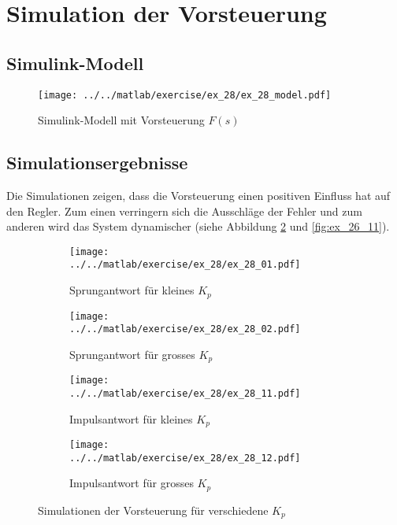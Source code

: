 \section{Simulation der Vorsteuerung}

\subsection{Simulink-Modell}
\begin{figure}[h!]
	\centering
	\texttt{[image: ../../matlab/exercise/ex\_28/ex\_28\_model.pdf]}
	\caption{Simulink-Modell mit Vorsteuerung $F(s)$}
\end{figure}

\subsection{Simulationsergebnisse}
Die Simulationen zeigen, dass die Vorsteuerung einen positiven Einfluss hat
auf den Regler. Zum einen verringern sich die Ausschläge der Fehler und zum
anderen wird das System dynamischer (siehe Abbildung \ref{fig:ex_28_11} und
\ref{fig:ex_26_11}).
\begin{figure}[h!]
	\centering
	\begin{subfigure}{0.45\textwidth}
		\texttt{[image: ../../matlab/exercise/ex\_28/ex\_28\_01.pdf]}
		\caption{Sprungantwort für kleines $K_p$}
		\label{fig:ex_28_01}
	\end{subfigure}
	\hfill{}
	\begin{subfigure}{0.45\textwidth}
		\texttt{[image: ../../matlab/exercise/ex\_28/ex\_28\_02.pdf]}
		\caption{Sprungantwort für grosses $K_p$}
	\end{subfigure}

	\begin{subfigure}{0.45\textwidth}
		\texttt{[image: ../../matlab/exercise/ex\_28/ex\_28\_11.pdf]}
		\caption{Impulsantwort für kleines $K_p$}
		\label{fig:ex_28_11}
	\end{subfigure}
	\hfill{}
	\begin{subfigure}{0.45\textwidth}
		\texttt{[image: ../../matlab/exercise/ex\_28/ex\_28\_12.pdf]}
		\caption{Impulsantwort für grosses $K_p$}
	\end{subfigure}

	\caption{Simulationen der Vorsteuerung für verschiedene $K_p$}

\end{figure}
